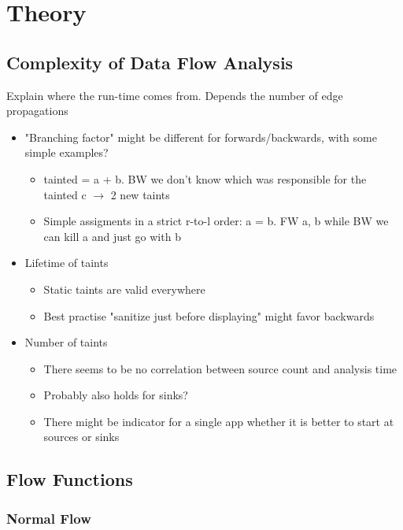 \documentclass[../draft.tex]{subfiles}
\begin{document}
    \chapter{Theory}
    \section{Complexity of Data Flow Analysis}
    Explain where the run-time comes from.
    Depends the number of edge propagations
    \begin{itemize}
        \item "Branching factor" might be different for forwards/backwards, with some simple examples?
            \begin{itemize}
                \item  tainted = a + b. BW we don't know which was responsible for the tainted c $\rightarrow$ 2 new taints
                \item Simple assigments in a strict r-to-l order: a = b. FW {a, b} while BW we can kill a and just go with {b}
            \end{itemize}
        \item Lifetime of taints 
        \begin{itemize}
            \item Static taints are valid everywhere
            \item Best practise "sanitize just before displaying" might favor backwards
        
        \end{itemize}
        \item Number of taints
        \begin{itemize}
            \item There seems to be no correlation between source count and analysis time
            \item Probably also holds for sinks?
            \item There might be indicator for a single app whether it is better to start at sources or sinks
        \end{itemize}


    \end{itemize}
    \section{Flow Functions}
    \subsection{Normal Flow}
\end{document}
